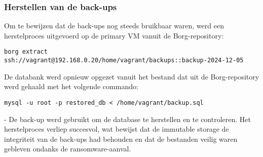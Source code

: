 \subsubsection{Herstellen van de back-ups}
Om te bewijzen dat de back-ups nog steeds bruikbaar waren, werd een herstelproces uitgevoerd op de primary VM vanuit de Borg-repository:
\begin{verbatim}
borg extract 
ssh://vagrant@192.168.0.20/home/vagrant/backups::backup-2024-12-05
\end{verbatim}

De databank werd opnieuw opgezet vanuit het bestand dat uit de Borg-repository werd gehaald met het volgende commando:
\begin{verbatim}
mysql -u root -p restored_db < /home/vagrant/backup.sql
\end{verbatim}-
De back-up werd gebruikt om de database te herstellen en te controleren. Het herstelproces verliep succesvol, wat bewijst dat de immutable storage de integriteit van de back-ups had behouden en dat de bestanden veilig waren gebleven ondanks de ransomware-aanval.



